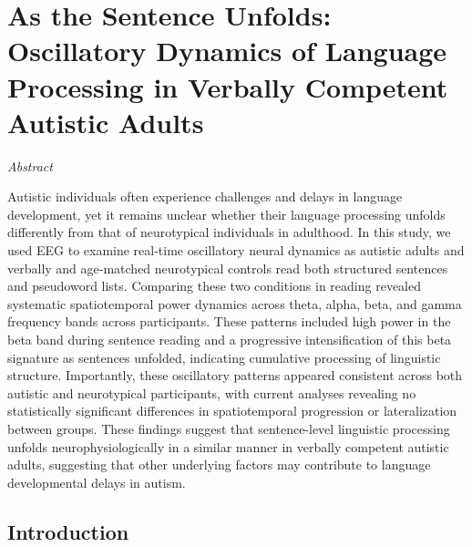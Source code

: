 \chapter{As the Sentence Unfolds: Oscillatory Dynamics of Language Processing in Verbally Competent Autistic Adults}
\label{ch:language_asc}

\begin{center}
    \large\textit{Abstract}
\end{center} 

{\abstractfont 
Autistic individuals often experience challenges and delays in language development, yet it remains unclear whether their language processing unfolds differently from that of neurotypical individuals in adulthood. In this study, we used EEG to examine real-time oscillatory neural dynamics as autistic adults and verbally and age-matched neurotypical controls read both structured sentences and pseudoword lists. Comparing these two conditions in reading revealed systematic spatiotemporal power dynamics across theta, alpha, beta, and gamma frequency bands across participants. These patterns included high power in the beta band during sentence reading and a progressive intensification of this beta signature as sentences unfolded, indicating cumulative processing of linguistic structure. Importantly, these oscillatory patterns appeared consistent across both autistic and neurotypical participants, with current analyses revealing no statistically significant differences in spatiotemporal progression or lateralization between groups. These findings suggest that sentence-level linguistic processing unfolds neurophysiologically in a similar manner in verbally competent autistic adults, suggesting that other underlying factors may contribute to language developmental delays in autism. \par
} 

\vspace*{\fill} 

\thispagestyle{empty}

\newpage

\section{Introduction}


